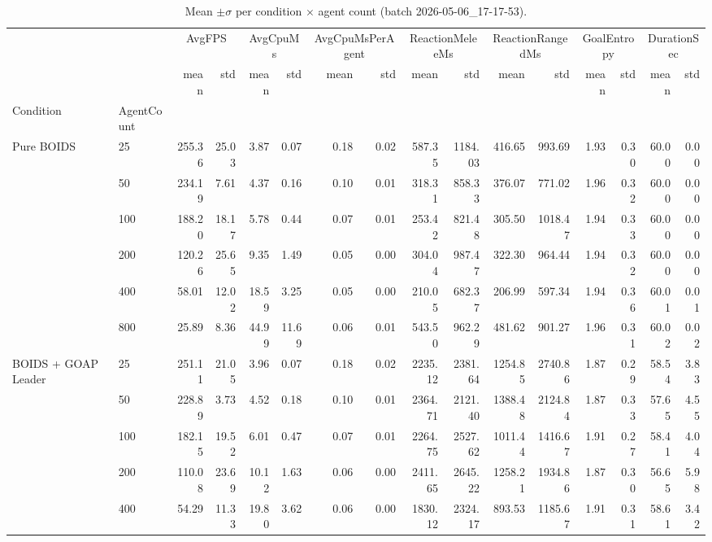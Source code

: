 \begin{table}[htbp]
  \centering
  \caption{Mean $\pm\sigma$ per condition $\times$ agent count (batch 2026-05-06_17-17-53).}
  \label{tab:summary-mean-sigma}
\begin{tabular}{llrrrrrrrrrrrrrr}
\toprule
 &  & \multicolumn{2}{c}{AvgFPS} & \multicolumn{2}{c}{AvgCpuMs} & \multicolumn{2}{c}{AvgCpuMsPerAgent} & \multicolumn{2}{c}{ReactionMeleeMs} & \multicolumn{2}{c}{ReactionRangedMs} & \multicolumn{2}{c}{GoalEntropy} & \multicolumn{2}{c}{DurationSec} \\
 &  & mean & std & mean & std & mean & std & mean & std & mean & std & mean & std & mean & std \\
Condition & AgentCount &  &  &  &  &  &  &  &  &  &  &  &  &  &  \\
\midrule
\multirow[t]{6}{*}{Pure BOIDS} & 25 & 255.36 & 25.03 & 3.87 & 0.07 & 0.18 & 0.02 & 587.35 & 1184.03 & 416.65 & 993.69 & 1.93 & 0.30 & 60.00 & 0.00 \\
 & 50 & 234.19 & 7.61 & 4.37 & 0.16 & 0.10 & 0.01 & 318.31 & 858.33 & 376.07 & 771.02 & 1.96 & 0.32 & 60.00 & 0.00 \\
 & 100 & 188.20 & 18.17 & 5.78 & 0.44 & 0.07 & 0.01 & 253.42 & 821.48 & 305.50 & 1018.47 & 1.94 & 0.33 & 60.00 & 0.00 \\
 & 200 & 120.26 & 25.65 & 9.35 & 1.49 & 0.05 & 0.00 & 304.04 & 987.47 & 322.30 & 964.44 & 1.94 & 0.32 & 60.00 & 0.00 \\
 & 400 & 58.01 & 12.02 & 18.59 & 3.25 & 0.05 & 0.00 & 210.05 & 682.37 & 206.99 & 597.34 & 1.94 & 0.36 & 60.01 & 0.01 \\
 & 800 & 25.89 & 8.36 & 44.99 & 11.69 & 0.06 & 0.01 & 543.50 & 962.29 & 481.62 & 901.27 & 1.96 & 0.31 & 60.02 & 0.02 \\
\cline{1-16}
\multirow[t]{6}{*}{BOIDS + GOAP Leader} & 25 & 251.11 & 21.05 & 3.96 & 0.07 & 0.18 & 0.02 & 2235.12 & 2381.64 & 1254.85 & 2740.86 & 1.87 & 0.29 & 58.54 & 3.83 \\
 & 50 & 228.89 & 3.73 & 4.52 & 0.18 & 0.10 & 0.01 & 2364.71 & 2121.40 & 1388.48 & 2124.84 & 1.87 & 0.33 & 57.65 & 4.55 \\
 & 100 & 182.15 & 19.52 & 6.01 & 0.47 & 0.07 & 0.01 & 2264.75 & 2527.62 & 1011.44 & 1416.67 & 1.91 & 0.27 & 58.41 & 4.04 \\
 & 200 & 110.08 & 23.69 & 10.12 & 1.63 & 0.06 & 0.00 & 2411.65 & 2645.22 & 1258.21 & 1934.86 & 1.87 & 0.30 & 56.65 & 5.98 \\
 & 400 & 54.29 & 11.33 & 19.80 & 3.62 & 0.06 & 0.00 & 1830.12 & 2324.17 & 893.53 & 1185.67 & 1.91 & 0.31 & 58.61 & 3.42 \\

\end{tabular}
\end{table}
